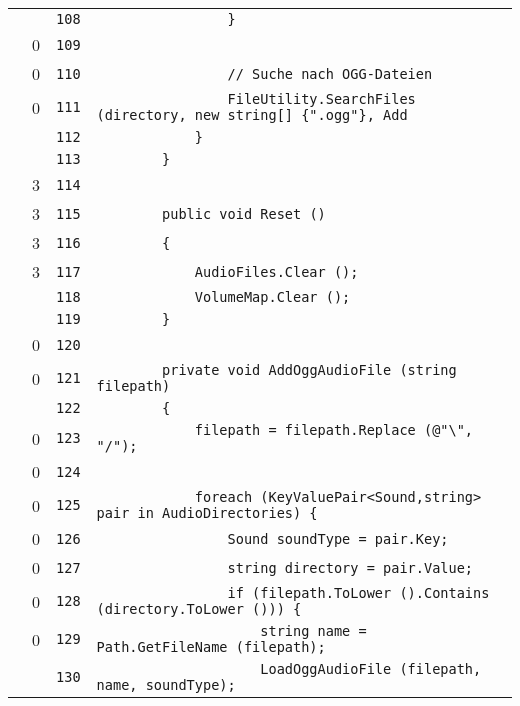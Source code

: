 \documentclass[a4paper,10pt]{article}
\begin{document}
\begin{longtable}[l]{lrrl}
\cellcolor{gray} &  & \verb~108~ & \verb~                }~\\
\cellcolor{red} & 0 & \verb~109~ & \verb~~\\
\cellcolor{red} & 0 & \verb~110~ & \verb~                // Suche nach OGG-Dateien~\\
\cellcolor{red} & 0 & \verb~111~ & \verb~                FileUtility.SearchFiles (directory, new string[] {".ogg"}, Add~\\
\cellcolor{gray} &  & \verb~112~ & \verb~            }~\\
\cellcolor{gray} &  & \verb~113~ & \verb~        }~\\
\cellcolor{green} & 3 & \verb~114~ & \verb~~\\
\cellcolor{green} & 3 & \verb~115~ & \verb~        public void Reset ()~\\
\cellcolor{green} & 3 & \verb~116~ & \verb~        {~\\
\cellcolor{green} & 3 & \verb~117~ & \verb~            AudioFiles.Clear ();~\\
\cellcolor{gray} &  & \verb~118~ & \verb~            VolumeMap.Clear ();~\\
\cellcolor{gray} &  & \verb~119~ & \verb~        }~\\
\cellcolor{red} & 0 & \verb~120~ & \verb~~\\
\cellcolor{red} & 0 & \verb~121~ & \verb~        private void AddOggAudioFile (string filepath)~\\
\cellcolor{gray} &  & \verb~122~ & \verb~        {~\\
\cellcolor{red} & 0 & \verb~123~ & \verb~            filepath = filepath.Replace (@"\", "/");~\\
\cellcolor{red} & 0 & \verb~124~ & \verb~~\\
\cellcolor{red} & 0 & \verb~125~ & \verb~            foreach (KeyValuePair<Sound,string> pair in AudioDirectories) {~\\
\cellcolor{red} & 0 & \verb~126~ & \verb~                Sound soundType = pair.Key;~\\
\cellcolor{red} & 0 & \verb~127~ & \verb~                string directory = pair.Value;~\\
\cellcolor{red} & 0 & \verb~128~ & \verb~                if (filepath.ToLower ().Contains (directory.ToLower ())) {~\\
\cellcolor{red} & 0 & \verb~129~ & \verb~                    string name = Path.GetFileName (filepath);~\\
\cellcolor{gray} &  & \verb~130~ & \verb~                    LoadOggAudioFile (filepath, name, soundType);~\\

\end{longtable}
\end{document}
